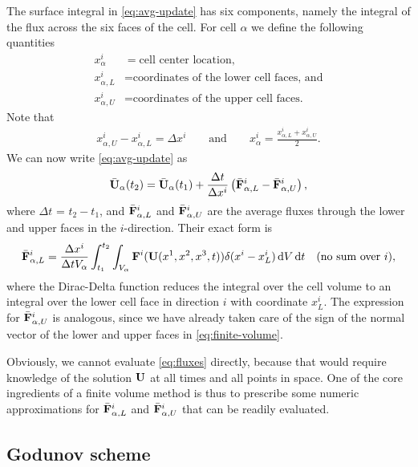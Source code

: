 \documentclass{article}
\begin{document}
The surface integral in \cref{eq:avg-update} has six components, namely the integral of the flux
across the six faces of the cell. For cell $\alpha$ we define the following quantities
\begin{align}
  \label{eq:cell-def}
  x_\alpha^i &= \text{cell center location}, \nonumber \\
  x_{\alpha,L}^i &= \text{coordinates of the lower cell faces, and} \nonumber \\
  x_{\alpha,U}^i &= \text{coordinates of the upper cell faces.}
\end{align}
Note that
\begin{align}
  x_{\alpha,U}^i - x_{\alpha,L}^i = \Delta x^i \qquad \text{and} \qquad
  x_\alpha^i = \frac{x_{\alpha,L}^i + x_{\alpha,U}^i}{2}.
\end{align}
We can now write \cref{eq:avg-update} as
\begin{align}
  \label{eq:finite-volume}
  \bar{\mathrm{\bf U}}_\alpha(t_2) = \bar{\mathrm{\bf U}}_\alpha(t_1) + \frac{\Delta t}{\Delta x^i}
          \left(\bar{\mathrm{\bf F}}^i_{\alpha,L} - \bar{\mathrm{\bf F}}^i_{\alpha,U}\right),
\end{align}
where $\Delta t$ = $t_2 - t_1$, and $\bar{\mathrm{\bf F}}^i_{\alpha,L}$ and
$\bar{\mathrm{\bf F}}^i_{\alpha,U}$ are the average fluxes through the lower and upper faces in the
$i$-direction. Their exact form is
\begin{align}
  \label{eq:fluxes}
  \bar{\mathrm{\bf F}}^i_{\alpha,L} = \frac{\Delta x^i}{\Delta t V_\alpha}\int_{t_1}^{t_2}
      \int_{V_\alpha} \mathrm{\bf F}^i(\mathrm{\bf U}(x^1, x^2, x^3, t)) \delta(x^i - x^i_L) \,\mathrm{d}V \,\mathrm{d}t
      \quad \text{(no sum over $i$)},
\end{align}
where the Dirac-Delta function reduces the integral over the cell volume to an integral over the
lower cell face in direction $i$ with coordinate $x^i_L$. The expression for
$\bar{\mathrm{\bf F}}^i_{\alpha,U}$ is analogous, since we have already taken care of the sign of the
normal vector of the lower and upper faces in \cref{eq:finite-volume}.

Obviously, we cannot evaluate \cref{eq:fluxes} directly, because that would require knowledge of the
solution $\mathrm{\bf U}$ at all times and all points in space. One of the core ingredients of a finite
volume method is thus to prescribe some numeric approximations for $\bar{\mathrm{\bf F}}^i_{\alpha,L}$
and $\bar{\mathrm{\bf F}}^i_{\alpha,U}$ that can be readily evaluated.

\subsection{Godunov scheme}
\end{document}
